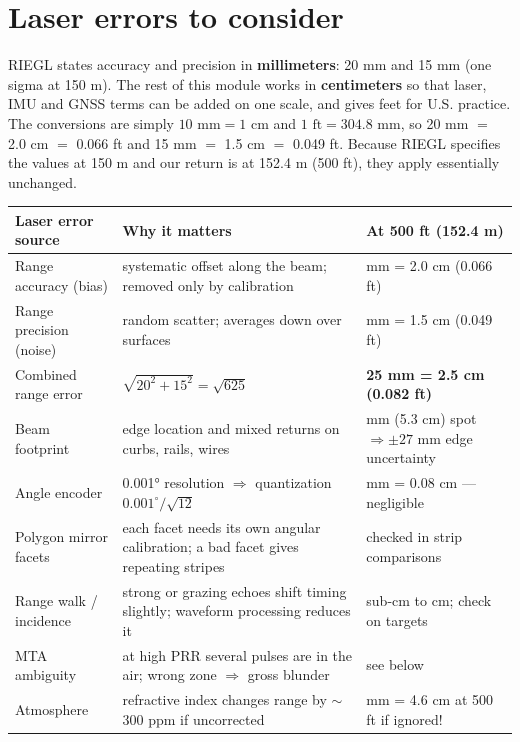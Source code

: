 \section{Laser errors to consider}
RIEGL states accuracy and precision in \textbf{millimeters}: 20 mm and 15 mm (one sigma at 150 m). The rest of this module works in \textbf{centimeters} so that laser, IMU and GNSS terms can be added on one scale, and gives feet for U.S. practice. The conversions are simply $10\text{ mm}=1\text{ cm}$ and $1\text{ ft}=304.8\text{ mm}$, so 20 mm $=$ 2.0 cm $=$ 0.066 ft and 15 mm $=$ 1.5 cm $=$ 0.049 ft. Because RIEGL specifies the values at 150 m and our return is at 152.4 m (500 ft), they apply essentially unchanged.

\begin{center}\small
\renewcommand{\arraystretch}{1.25}
\begin{tabularx}{\linewidth}{>{\raggedright\arraybackslash}p{3.6cm}X>{\raggedright\arraybackslash}p{2.6cm}}\toprule
\textbf{Laser error source} & \textbf{Why it matters} & \textbf{At 500 ft (152.4 m)}\\\midrule
Range accuracy (bias) & systematic offset along the beam; removed only by calibration & 20 mm = 2.0 cm (0.066 ft)\\
Range precision (noise) & random scatter; averages down over surfaces & 15 mm = 1.5 cm (0.049 ft)\\
Combined range error & $\sqrt{20^2+15^2}=\sqrt{625}$ & \textbf{25 mm = 2.5 cm (0.082 ft)}\\
Beam footprint & edge location and mixed returns on curbs, rails, wires & 53 mm (5.3 cm) spot $\Rightarrow\pm27$ mm edge uncertainty\\
Angle encoder & 0.001° resolution $\Rightarrow$ quantization $0.001^\circ/\sqrt{12}$ & 0.8 mm = 0.08 cm --- negligible\\
Polygon mirror facets & each facet needs its own angular calibration; a bad facet gives repeating stripes & checked in strip comparisons\\
Range walk / incidence & strong or grazing echoes shift timing slightly; waveform processing reduces it & sub-cm to cm; check on targets\\
MTA ambiguity & at high PRR several pulses are in the air; wrong zone $\Rightarrow$ gross blunder & see below\\
Atmosphere & refractive index changes range by $\sim$300 ppm if uncorrected & 46 mm = 4.6 cm at 500 ft if ignored!\\\bottomrule
\end{tabularx}\end{center}

